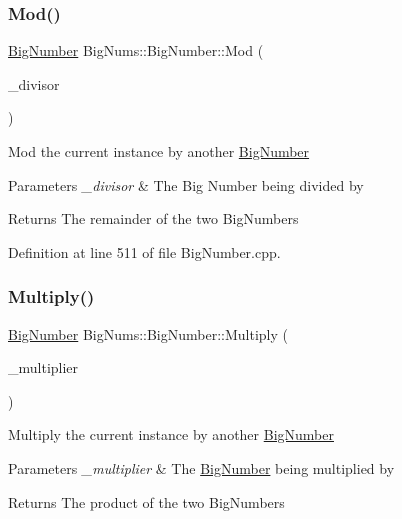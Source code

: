 \subsubsection{\texorpdfstring{Mod()}{Mod()}}
{\footnotesize\ttfamily \mbox{\hyperlink{class_big_nums_1_1_big_number}{Big\+Number}} Big\+Nums\+::\+Big\+Number\+::\+Mod (\begin{DoxyParamCaption}\item[{const \mbox{\hyperlink{class_big_nums_1_1_big_number}{Big\+Number}} \&}]{\+\_\+divisor }\end{DoxyParamCaption})}

Mod the current instance by another \mbox{\hyperlink{class_big_nums_1_1_big_number}{Big\+Number}} 
\begin{DoxyParams}{Parameters}
{\em \+\_\+divisor} & The Big Number being divided by \\
\hline
\end{DoxyParams}
\begin{DoxyReturn}{Returns}
The remainder of the two Big\+Numbers 
\end{DoxyReturn}


Definition at line 511 of file Big\+Number.\+cpp.

\mbox{\label{class_big_nums_1_1_big_number_a7d54b0defb30727ab99a110b1b6c07ff}} 
\subsubsection{\texorpdfstring{Multiply()}{Multiply()}}
{\footnotesize\ttfamily \mbox{\hyperlink{class_big_nums_1_1_big_number}{Big\+Number}} Big\+Nums\+::\+Big\+Number\+::\+Multiply (\begin{DoxyParamCaption}\item[{const \mbox{\hyperlink{class_big_nums_1_1_big_number}{Big\+Number}} \&}]{\+\_\+multiplier }\end{DoxyParamCaption})}

Multiply the current instance by another \mbox{\hyperlink{class_big_nums_1_1_big_number}{Big\+Number}} 
\begin{DoxyParams}{Parameters}
{\em \+\_\+multiplier} & The \mbox{\hyperlink{class_big_nums_1_1_big_number}{Big\+Number}} being multiplied by \\
\hline
\end{DoxyParams}
\begin{DoxyReturn}{Returns}
The product of the two Big\+Numbers 
\end{DoxyReturn}


